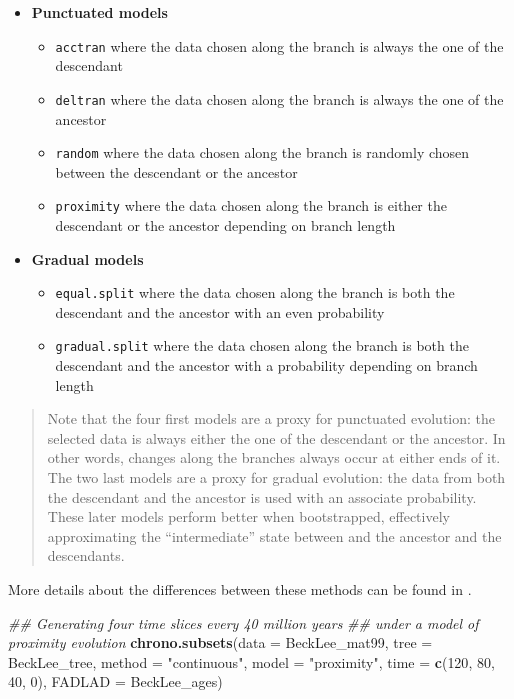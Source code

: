 \documentclass[
]{book}
\newenvironment{Shaded}{\begin{snugshade}}{\end{snugshade}}
\newcommand{\CommentTok}[1]{\textcolor[rgb]{0.56,0.35,0.01}{\textit{#1}}}
\newcommand{\DataTypeTok}[1]{\textcolor[rgb]{0.13,0.29,0.53}{#1}}
\newcommand{\DecValTok}[1]{\textcolor[rgb]{0.00,0.00,0.81}{#1}}
\newcommand{\KeywordTok}[1]{\textcolor[rgb]{0.13,0.29,0.53}{\textbf{#1}}}
\newcommand{\NormalTok}[1]{#1}
\newcommand{\StringTok}[1]{\textcolor[rgb]{0.31,0.60,0.02}{#1}}
\providecommand{\tightlist}{%
  \setlength{\itemsep}{0pt}\setlength{\parskip}{0pt}}
\begin{document}
\begin{itemize}
\tightlist
\item
  \textbf{Punctuated models}

  \begin{itemize}
  \tightlist
  \item
    \texttt{acctran} where the data chosen along the branch is always the one of the descendant
  \item
    \texttt{deltran} where the data chosen along the branch is always the one of the ancestor
  \item
    \texttt{random} where the data chosen along the branch is randomly chosen between the descendant or the ancestor
  \item
    \texttt{proximity} where the data chosen along the branch is either the descendant or the ancestor depending on branch length
  \end{itemize}
\item
  \textbf{Gradual models}

  \begin{itemize}
  \tightlist
  \item
    \texttt{equal.split} where the data chosen along the branch is both the descendant and the ancestor with an even probability
  \item
    \texttt{gradual.split} where the data chosen along the branch is both the descendant and the ancestor with a probability depending on branch length
  \end{itemize}
\end{itemize}

\begin{quote}
Note that the four first models are a proxy for punctuated evolution: the selected data is always either the one of the descendant or the ancestor.
In other words, changes along the branches always occur at either ends of it.
The two last models are a proxy for gradual evolution: the data from both the descendant and the ancestor is used with an associate probability.
These later models perform better when bootstrapped, effectively approximating the ``intermediate'' state between and the ancestor and the descendants.
\end{quote}

More details about the differences between these methods can be found in \citet{time-slice}.

\begin{Shaded}
\begin{Highlighting}[]
\CommentTok{\#\# Generating four time slices every 40 million years}
\CommentTok{\#\# under a model of proximity evolution}
\KeywordTok{chrono.subsets}\NormalTok{(}\DataTypeTok{data =}\NormalTok{ BeckLee\_mat99, }\DataTypeTok{tree =}\NormalTok{ BeckLee\_tree, }
               \DataTypeTok{method =} \StringTok{"continuous"}\NormalTok{, }\DataTypeTok{model =} \StringTok{"proximity"}\NormalTok{,}
               \DataTypeTok{time =} \KeywordTok{c}\NormalTok{(}\DecValTok{120}\NormalTok{, }\DecValTok{80}\NormalTok{, }\DecValTok{40}\NormalTok{, }\DecValTok{0}\NormalTok{),}
               \DataTypeTok{FADLAD =}\NormalTok{ BeckLee\_ages)}
\end{Highlighting}
\end{Shaded}
\end{document}
